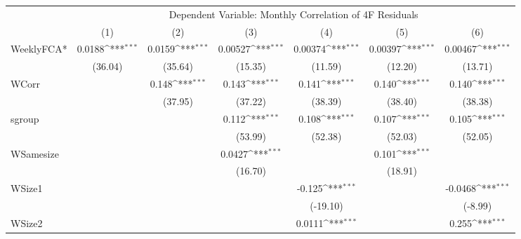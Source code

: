 {
\def\sym#1{\ifmmode^{#1}\else\(^{#1}\)\fi}
\begin{tabular}{l*{6}{c}}
\hline\hline
 & \multicolumn{6}{c}{Dependent Variable: Monthly Correlation of 4F Residuals}                 \\
 \cline{2-7}
                    &\multicolumn{1}{c}{(1)}         &\multicolumn{1}{c}{(2)}         &\multicolumn{1}{c}{(3)}         &\multicolumn{1}{c}{(4)}         &\multicolumn{1}{c}{(5)}         &\multicolumn{1}{c}{(6)}         \\
\hline
WeeklyFCA*          &      0.0188\sym{***}&      0.0159\sym{***}&     0.00527\sym{***}&     0.00374\sym{***}&     0.00397\sym{***}&     0.00467\sym{***}\\
                    &     (36.04)         &     (35.64)         &     (15.35)         &     (11.59)         &     (12.20)         &     (13.71)         \\
[1em]
WCorr               &                     &       0.148\sym{***}&       0.143\sym{***}&       0.141\sym{***}&       0.140\sym{***}&       0.140\sym{***}\\
                    &                     &     (37.95)         &     (37.22)         &     (38.39)         &     (38.40)         &     (38.38)         \\
[1em]
sgroup              &                     &                     &       0.112\sym{***}&       0.108\sym{***}&       0.107\sym{***}&       0.105\sym{***}\\
                    &                     &                     &     (53.99)         &     (52.38)         &     (52.03)         &     (52.05)         \\
[1em]
WSamesize           &                     &                     &      0.0427\sym{***}&                     &       0.101\sym{***}&                     \\
                    &                     &                     &     (16.70)         &                     &     (18.91)         &                     \\
[1em]
WSize1              &                     &                     &                     &      -0.125\sym{***}&                     &     -0.0468\sym{***}\\
                    &                     &                     &                     &    (-19.10)         &                     &     (-8.99)         \\
[1em]
WSize2              &                     &                     &                     &      0.0111\sym{***}&                     &       0.255\sym{***}\\

\end{tabular}}
